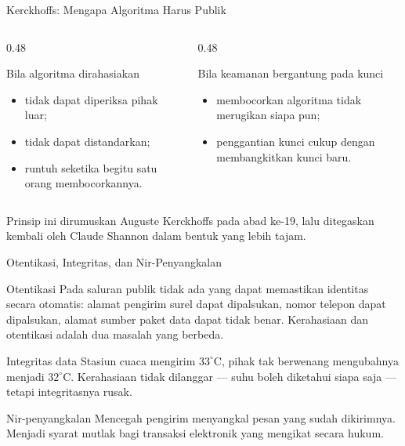 \documentclass[aspectratio=169,11pt]{beamer}
\begin{document}
\begin{frame}{Kerckhoffs: Mengapa Algoritma Harus Publik}
    \begin{columns}[T,onlytextwidth]
        \begin{column}{0.48\textwidth}
            \begin{alertblock}{Bila algoritma dirahasiakan}
                \begin{itemize}
                    \item tidak dapat diperiksa pihak luar;
                    \item tidak dapat distandarkan;
                    \item runtuh seketika begitu satu orang membocorkannya.
                \end{itemize}
            \end{alertblock}
        \end{column}
        \begin{column}{0.48\textwidth}
            \begin{exampleblock}{Bila keamanan bergantung pada kunci}
                \begin{itemize}
                    \item membocorkan algoritma tidak merugikan siapa pun;
                    \item penggantian kunci cukup dengan membangkitkan kunci baru.
                \end{itemize}
            \end{exampleblock}
        \end{column}
    \end{columns}
    \vspace{0.35cm}
    Prinsip ini dirumuskan Auguste Kerckhoffs pada abad ke-19, lalu ditegaskan
    kembali oleh Claude Shannon dalam bentuk yang lebih tajam.
\end{frame}

\begin{frame}{Otentikasi, Integritas, dan Nir-Penyangkalan}
    \begin{block}{Otentikasi}
        Pada saluran publik tidak ada yang dapat memastikan identitas secara
        otomatis: alamat pengirim surel dapat dipalsukan, nomor telepon dapat
        dipalsukan, alamat sumber paket data dapat tidak benar. Kerahasiaan dan
        otentikasi adalah dua masalah yang berbeda.
    \end{block}
    \begin{block}{Integritas data}
        Stasiun cuaca mengirim $33^{\circ}$C, pihak tak berwenang mengubahnya
        menjadi $32^{\circ}$C. Kerahasiaan tidak dilanggar --- suhu boleh diketahui
        siapa saja --- tetapi integritasnya rusak.
    \end{block}
    \begin{block}{Nir-penyangkalan}
        Mencegah pengirim menyangkal pesan yang sudah dikirimnya. Menjadi syarat
        mutlak bagi transaksi elektronik yang mengikat secara hukum.
    \end{block}
\end{frame}
\end{document}

